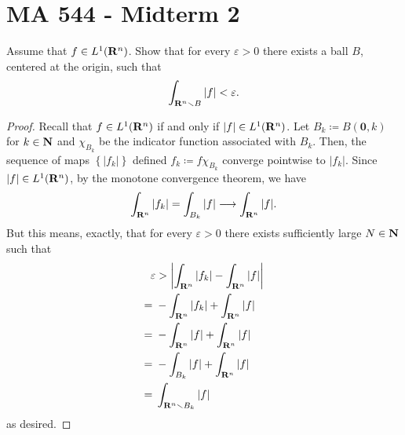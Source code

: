 \section{MA 544 - Midterm 2}
\begin{problem}
Assume that $f\in L^1(\mathbf{R}^n)$. Show that for every $\varepsilon>0$ there
exists a ball $B$, centered at the origin, such that
\[
\int_{\mathbf{R}^n\smallsetminus B}|f|<\varepsilon.
\]
\end{problem}
\begin{proof}
Recall that $f\in L^1(\mathbf{R}^n)$ if and only if $|f|\in
L^1(\mathbf{R}^n)$. Let $B_k\coloneqq B(\mathbf{0},k)$ for $k\in\mathbf{N}$ and
$\chi_{B_k}$ be the indicator function associated with $B_k$. Then, the
sequence of maps $\left\{|f_k|\right\}$ defined $f_k\coloneqq f\chi_{B_k}$
converge pointwise to $|f_k|$. Since $|f|\in L^1(\mathbf{R}^n)$, by the monotone
convergence theorem, we have
\begin{equation}
\label{eq:monotonicity-2-1}
\int_{\mathbf{R}^n} |f_k|=\int_{B_k}|f|\longrightarrow\int_{\mathbf{R}^n}|f|.
\end{equation}
But this means, exactly, that for every $\varepsilon>0$ there exists
sufficiently large $N\in\mathbf{N}$ such that
\begin{equation}
\label{eq:desired-inequality-2-1}
\begin{aligned}
\varepsilon&>\left|\int_{\mathbf{R}^n}|f_k|-\int_{\mathbf{R}^n}|f|\right|\\
={}&-\int_{\mathbf{R}^n}|f_k|+\int_{\mathbf{R}^n}|f|\\
={}&-\int_{\mathbf{R}^n}|f|+\int_{\mathbf{R}^n}|f|\\
={}&-\int_{B_k}|f|+\int_{\mathbf{R}^n}|f|\\
={}&\int_{\mathbf{R}^n\smallsetminus B_k}|f|
\end{aligned}
\end{equation}
as desired.
\end{proof}

